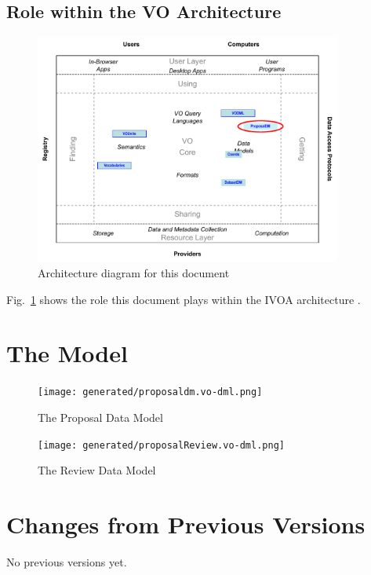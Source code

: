 \documentclass[11pt,a4paper]{ivoa}
\begin{document}
\subsection{Role within the VO Architecture}

\begin{figure}
\centering


\includegraphics[width=0.9\textwidth]{role_diagram.pdf}
\caption{Architecture diagram for this document}
\label{fig:archdiag}
\end{figure}

Fig.~\ref{fig:archdiag} shows the role this document plays within the
IVOA architecture \citep{2010ivoa.rept.1123A}.

\section{The Model}

\begin{figure}
    \centering
\texttt{[image: generated/proposaldm.vo-dml.png]}
\caption{The Proposal Data Model}
\label{fig:propdm}
\end{figure}

\begin{figure}
    \centering
    \texttt{[image: generated/proposalReview.vo-dml.png]}
    \caption{The Review Data Model}
    \label{fig:proprevdm}
\end{figure}

\appendix
\section{Changes from Previous Versions}

No previous versions yet.  



\end{document}
